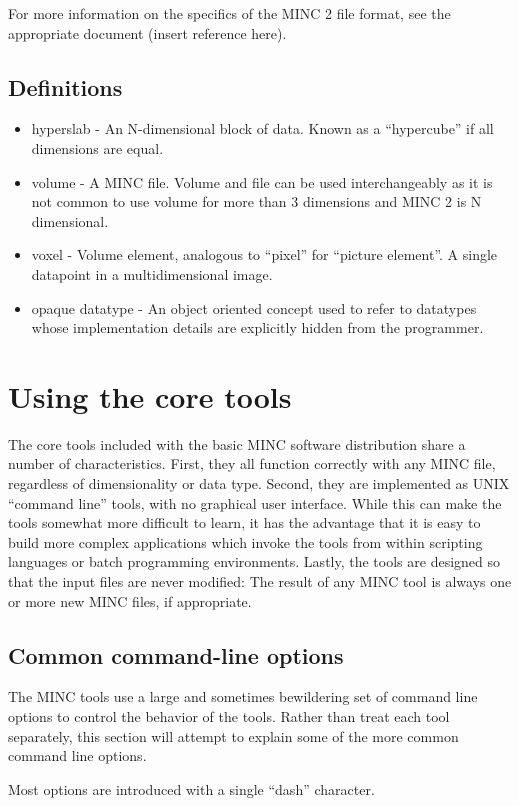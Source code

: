\documentclass{article}
\begin{document}
For more information on the specifics of the MINC 2 file format, see the
appropriate document (insert reference here).

\subsection{Definitions}
\begin{itemize}
\item hyperslab - An N-dimensional block of data.  Known as a
``hypercube'' if all dimensions are equal.
\item volume - A MINC file. Volume and file can be used interchangeably
as it is not common to use volume for more than
3 dimensions and MINC 2 is N dimensional.
\item voxel - Volume element, analogous to ``pixel'' for ``picture
element''. A single datapoint in a multidimensional image.
\item opaque datatype - An object oriented concept used to refer
to datatypes whose implementation details are explicitly hidden from
the programmer.
\end{itemize}
\newpage
\section{Using the core tools}
The core tools included with the basic MINC software distribution
share a number of characteristics.  First, they all function correctly
with any MINC file, regardless of dimensionality or data type.
Second, they are implemented as UNIX ``command line'' tools, with no
graphical user interface.  While this can make the tools somewhat more
difficult to learn, it has the advantage that it is easy to build more
complex applications which invoke the tools from within scripting
languages or batch programming environments.  Lastly, the tools are
designed so that the input files are never modified: The result of any
MINC tool is always one or more new MINC files, if appropriate.

\subsection{Common command-line options}
The MINC tools use a large and sometimes bewildering set of command line
options to control the behavior of the tools.  Rather than treat
each tool separately, this section will attempt to explain some of the 
more common command line options.

Most options are introduced with a single ``dash'' character.
\end{document}
